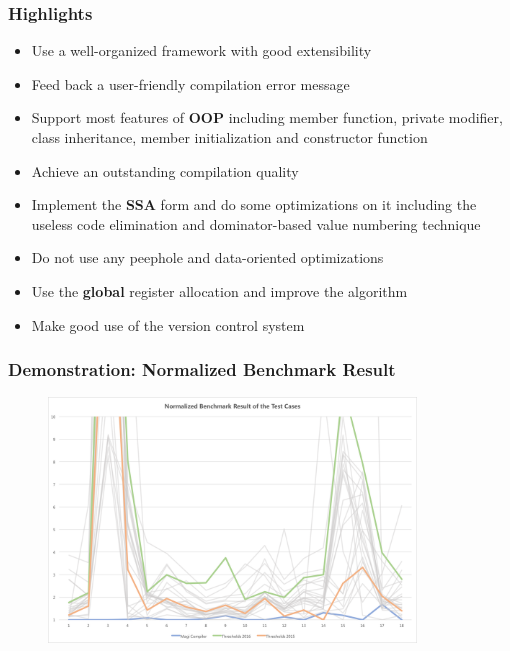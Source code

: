 \documentclass{beamer}
\begin{document}
	\begin{frame}
		\frametitle{Highlights}
		\begin{itemize}
			\item Use a well-organized framework with good extensibility
			\item Feed back a user-friendly compilation error message
			\item Support most features of \textbf{OOP} including member function, private modifier, class inheritance, member initialization and constructor function
			\item Achieve an outstanding compilation quality
			\item<0-0> Implement the \textbf{SSA} form and do some optimizations on it including the useless code elimination and dominator-based value numbering technique
			\item<0-0> Do not use any peephole and data-oriented optimizations
			\item<0-0> Use the \textbf{global} register allocation and improve the algorithm
			\item<0-0> Make good use of the version control system
		\end{itemize}
	\end{frame}

	\begin{frame}
		\frametitle{Demonstration: Normalized Benchmark Result}
		\begin{figure}[!htp]
			\includegraphics[height=6.5cm]{image/benchmark/thresholds}
		\end{figure}
	\end{frame}
\end{document}
